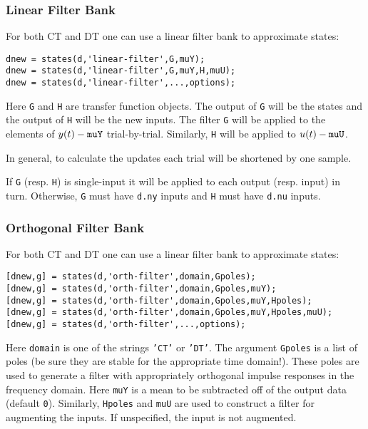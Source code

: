 \documentclass{article}
\begin{document}
\subsubsection{Linear Filter Bank}
\label{linear-filter}
For both CT and DT one can use a linear filter bank to approximate states:
\begin{verbatim}
dnew = states(d,'linear-filter',G,muY);
dnew = states(d,'linear-filter',G,muY,H,muU);
dnew = states(d,'linear-filter',...,options);
\end{verbatim}
 Here {\tt G} and {\tt H} are transfer function objects.
 The output of {\tt G} will be the states and the output of {\tt H}
 will be the new inputs.    The filter {\tt G} will be applied to the
 elements of $y(t) - {\tt muY}$ trial-by-trial.  Similarly, {\tt H}
 will be applied to $u(t) - {\tt muU}$.
 
 In general, to calculate the updates each trial will be shortened by
 one sample.

 If {\tt G} (resp. {\tt H}) is single-input it will be applied to each
 output (resp. input) in turn.  Otherwise, {\tt G} must have {\tt d.ny}
 inputs and {\tt H} must have {\tt d.nu} inputs.  





\subsubsection{Orthogonal Filter Bank}
For both CT and DT one can use a linear filter bank to approximate states:
\begin{verbatim}
[dnew,g] = states(d,'orth-filter',domain,Gpoles);
[dnew,g] = states(d,'orth-filter',domain,Gpoles,muY);
[dnew,g] = states(d,'orth-filter',domain,Gpoles,muY,Hpoles);
[dnew,g] = states(d,'orth-filter',domain,Gpoles,muY,Hpoles,muU);
[dnew,g] = states(d,'orth-filter',...,options);
\end{verbatim}
Here {\tt domain} is one of  the strings {\tt 'CT'} or {\tt 'DT'}.
The argument {\tt Gpoles} is a list of poles (be sure they are stable
for the appropriate time domain!).  These poles are used to generate
a filter with appropriately orthogonal impulse responses in the
frequency domain. Here {\tt muY} is a
mean to be subtracted off of the output data (default {\tt 0}).
Similarly, {\tt Hpoles} and {\tt muU} are used to construct a filter
for augmenting the inputs.  If unspecified, the input is not
augmented.
\end{document}
